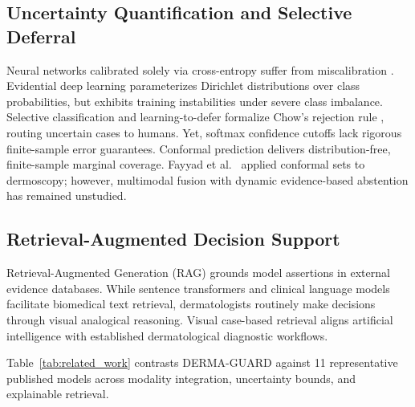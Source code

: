 \documentclass[conference]{IEEEtran}
\begin{document}
\subsection{Uncertainty Quantification and Selective Deferral}
Neural networks calibrated solely via cross-entropy suffer from miscalibration \cite{guo2017calibration}. Evidential deep learning \cite{sensoy2018evidential} parameterizes Dirichlet distributions over class probabilities, but exhibits training instabilities under severe class imbalance. Selective classification \cite{geifman2017selective} and learning-to-defer \cite{mozannar2020consistent} formalize Chow's rejection rule \cite{chow1970optimum}, routing uncertain cases to humans. Yet, softmax confidence cutoffs lack rigorous finite-sample error guarantees. Conformal prediction \cite{vovk2005algorithmic, angelopoulos2021gentle} delivers distribution-free, finite-sample marginal coverage. Fayyad et al.\ \cite{fayyad2024empirical} applied conformal sets to dermoscopy; however, multimodal fusion with dynamic evidence-based abstention has remained unstudied.

\subsection{Retrieval-Augmented Decision Support}
Retrieval-Augmented Generation (RAG) \cite{lewis2020retrieval} grounds model assertions in external evidence databases. While sentence transformers \cite{wang2020minilm} and clinical language models \cite{alsentzer2019publicly} facilitate biomedical text retrieval, dermatologists routinely make decisions through visual analogical reasoning. Visual case-based retrieval aligns artificial intelligence with established dermatological diagnostic workflows.

Table~\ref{tab:related_work} contrasts DERMA-GUARD against 11 representative published models across modality integration, uncertainty bounds, and explainable retrieval.
\end{document}
